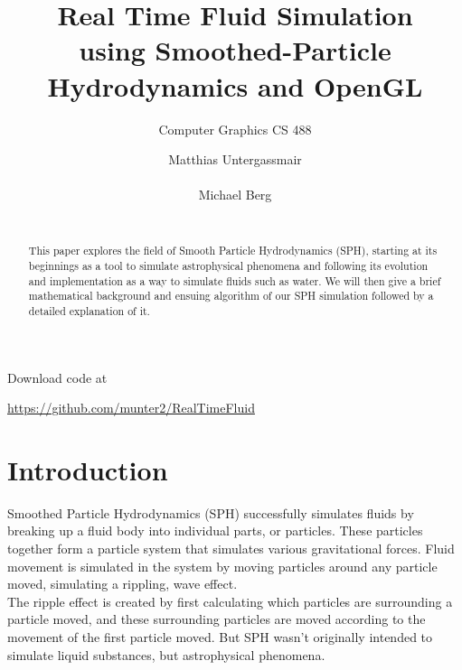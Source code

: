 \documentclass{sigchi}
\title{Real Time Fluid Simulation \\ \smaller using Smoothed-Particle Hydrodynamics and OpenGL}
\subtitle{Computer Graphics CS 488}
\author{
  \alignauthor Matthias Untergassmair\\
    \email{munter2@uic.edu}\\
  \alignauthor Michael Berg\\
    \email{mberg4@uic.edu}\\
}
\begin{document}
\maketitle


\begin{abstract}
	This paper explores the field of Smooth Particle Hydrodynamics (SPH), starting at its 
beginnings as a tool to simulate astrophysical phenomena and following its evolution and 
implementation as a way to simulate fluids such as water. We will then give a brief 
mathematical background and ensuing algorithm of our SPH simulation followed by a detailed 
explanation of it.
\end{abstract}



Download code at
\begin{center}
	\url{https://github.com/munter2/RealTimeFluid}
\end{center}

\clearpage

\section{Introduction}
%
\hspace{6 pt} Smoothed Particle Hydrodynamics (SPH) successfully simulates fluids by breaking up a 
fluid body into individual parts, or particles. These particles together form a particle 
system that simulates various gravitational forces. Fluid movement is simulated in the 
system by moving particles around any particle moved, simulating a rippling, wave effect.
\\
\hspace*{6 pt} The ripple effect is created by first calculating which particles are surrounding 
a particle moved, and these surrounding particles are moved according to the movement 
of the first particle moved. But SPH wasn't originally intended to simulate liquid 
substances, but astrophysical phenomena.
%
\end{document}
